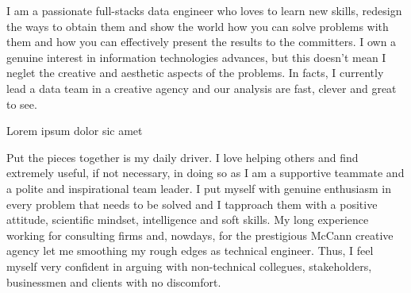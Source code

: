 \documentclass[11pt, a4paper]{awesome-cv}
\begin{document}
\makecvheader

\makelettertitle

\begin{cvletter}
I am a passionate full-stacks data engineer who loves to learn new skills, redesign the ways to obtain them and show the world how you can solve problems with them and how you can effectively present the results to the committers. I own a genuine interest in information technologies advances, but this doesn't mean I neglet the creative and aesthetic aspects of the problems. In facts, I currently lead a data team in a creative agency and our analysis are fast, clever and great to see.

Lorem ipsum dolor sic amet

Put the pieces together is my daily driver. I love helping others and find extremely useful, if not necessary, in doing so as I am a supportive teammate and a polite and inspirational team leader. I put myself with genuine enthusiasm in every problem that needs to be solved and I tapproach them with a positive attitude, scientific mindset, intelligence and soft skills. My long experience working for consulting firms and, nowdays, for the prestigious McCann creative agency let me smoothing my rough edges as technical engineer. Thus, I feel myself very confident in arguing with non-technical collegues, stakeholders, businessmen and clients with no discomfort.  
\end{cvletter}

\makeletterclosing
\end{document}
